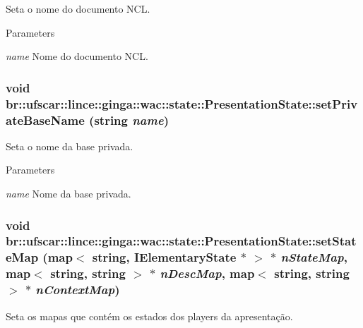 Seta o nome do documento NCL. 


\begin{DoxyParams}{Parameters}
\item[{\em name}]Nome do documento NCL. \end{DoxyParams}
\hypertarget{classbr_1_1ufscar_1_1lince_1_1ginga_1_1wac_1_1state_1_1PresentationState_a127842284622579c23ec1d6ce974fe8f}{
\subsubsection[{setPrivateBaseName}]{\setlength{\rightskip}{0pt plus 5cm}void br::ufscar::lince::ginga::wac::state::PresentationState::setPrivateBaseName (string {\em name})}}
\label{classbr_1_1ufscar_1_1lince_1_1ginga_1_1wac_1_1state_1_1PresentationState_a127842284622579c23ec1d6ce974fe8f}


Seta o nome da base privada. 


\begin{DoxyParams}{Parameters}
\item[{\em name}]Nome da base privada. \end{DoxyParams}
\hypertarget{classbr_1_1ufscar_1_1lince_1_1ginga_1_1wac_1_1state_1_1PresentationState_a02bf97b60acc4e5ba168961d8e695195}{
\subsubsection[{setStateMap}]{\setlength{\rightskip}{0pt plus 5cm}void br::ufscar::lince::ginga::wac::state::PresentationState::setStateMap (map$<$ string, {\bf IElementaryState} $\ast$ $>$ $\ast$ {\em nStateMap}, \/  map$<$ string, string $>$ $\ast$ {\em nDescMap}, \/  map$<$ string, string $>$ $\ast$ {\em nContextMap})}}
\label{classbr_1_1ufscar_1_1lince_1_1ginga_1_1wac_1_1state_1_1PresentationState_a02bf97b60acc4e5ba168961d8e695195}


Seta os mapas que contém os estados dos players da apresentação. 


